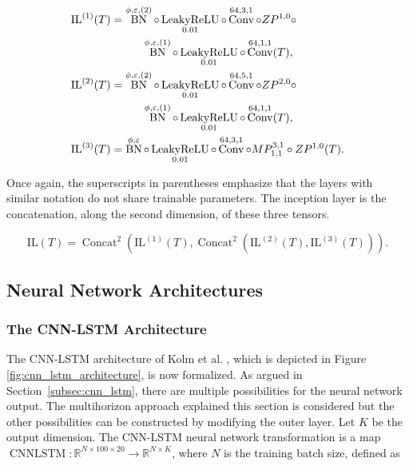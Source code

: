\documentclass[10pt,a4paper,oneside]{article}
\newcommand{\R}{\mathbb{R}}
\DeclareMathOperator{\concat}{Concat}
\DeclareMathOperator{\LeakyReLU}{LeakyReLU}
\DeclareMathOperator{\batchnorm}{BN}
\DeclareMathOperator{\convolution}{Conv}
\DeclareMathOperator{\cnnlstm}{CNNLSTM}
\begin{document}
\begin{align*}
    \mathrm{IL}^{(1)}(T) &= \batchnorm^{\phi, \varepsilon, (2)} \circ \LeakyReLU_{0.01} \circ \convolution^{64, 3, 1} \circ ZP^{1,0} \circ \\
    & \hspace{10mm}\batchnorm^{\phi, \varepsilon, (1)} \circ \LeakyReLU_{0.01} \circ \convolution^{64, 1, 1} (T),\\
    \mathrm{IL}^{(2)}(T) &= \batchnorm^{\phi, \varepsilon, (2)} \circ \LeakyReLU_{0.01} \circ \convolution^{64, 5, 1} \circ ZP^{2,0} \circ \\
    & \hspace{10mm} \batchnorm^{\phi, \varepsilon, (1)} \circ \LeakyReLU_{0.01} \circ \convolution^{64, 1, 1} (T), \\
    \mathrm{IL}^{(3)}(T) &= \batchnorm^{\phi, \varepsilon} \circ \LeakyReLU_{0.01} \circ \convolution^{64, 3, 1} \circ MP^{3, 1}_{1, 1} \circ ZP^{1, 0}(T).\\
\end{align*}

Once again, the superscripts in parentheses emphasize that the layers with similar notation do not share trainable parameters. The inception layer is the concatenation, along the second dimension, of these three tensors.

$$
\mathrm{IL}(T) = \concat^{2}(\mathrm{IL}^{(1)}(T), \concat^{2}(\mathrm{IL}^{(2)}(T), \mathrm{IL}^{(3)}(T))).
$$

\subsection{Neural Network Architectures}
\label{subsec:nn_architectures}

\subsubsection{The CNN-LSTM Architecture}
\label{subsubsec:cnn_lstm_architecture}

The CNN-LSTM architecture of Kolm et al. \cite{kolm2023deep}, which is depicted in Figure \ref{fig:cnn_lstm_architecture}, is now formalized. As argued in Section~\ref{subsec:cnn_lstm}, there are multiple possibilities for the neural network output. The multihorizon approach explained this section is considered but the other possibilities can be constructed by modifying the outer layer. Let $K$ be the output dimension. The CNN-LSTM neural network transformation is a map $\cnnlstm : \R^{N \times 100 \times 20} \rightarrow \R^{N \times K}$, where $N$ is the training batch size, defined as
\end{document}
